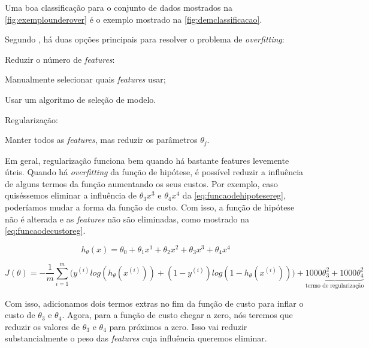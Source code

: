 Uma boa classificação para o conjunto de dados mostrados na \autoref{fig:exemplounderover} é o exemplo mostrado na \autoref{fig:demclassificacao}.

Segundo \cite{machinelearningcoursera}, há duas opções principais para resolver o problema de \textit{overfitting}:

\begin{alineas}
	\item Reduzir o número de \textit{features}:
		\begin{alineas}
			\item Manualmente selecionar quais \textit{features} usar;
			\item Usar um algoritmo de seleção de modelo.
		\end{alineas}
	\item Regularização:
		\begin{alineas}
			\item Manter todos as \textit{features}, mas reduzir os parâmetros $\theta_j$.
		\end{alineas}
\end{alineas}

Em geral, regularização funciona bem quando há bastante features levemente úteis. Quando há \textit{overfitting} da função de hipótese, é possível reduzir a influência de alguns termos da função aumentando os seus custos. Por exemplo, caso quiséssemos eliminar a influência de $\theta_3x^3$ e $\theta_4x^4$ da \autoref{eq:funcaodehipotesereg}, poderíamos mudar a forma da função de custo. Com isso, a função de hipótese não é alterada e as \textit{features} não são eliminadas, como mostrado na \autoref{eq:funcaodecustoreg}.

\begin{equation} \label{eq:funcaodehipotesereg}
h_{\theta}(x) = \theta_0 + \theta_1 x^1 + \theta_2 x^2 + \theta_3 x^3 + \theta_4 x^4
\end{equation}

\begin{equation} \label{eq:funcaodecustoreg}
J(\theta) = - \frac{1}{m}\sum\limits_{i=1}^{m}\Big( y^{(i)}log(h_{\theta}(x^{(i)})) + (1-y^{(i)})log(1 - h_{\theta}(x^{(i)})) \Big)
+ \underbrace{1000 \theta_3^2 + 1000 \theta_4^2}_\text{termo de regularização}
\end{equation}

Com isso, adicionamos dois termos extras no fim da função de custo para inflar o custo de $\theta_3$ e $\theta_4$. Agora, para a função de custo chegar a zero, nós teremos que reduzir os valores de $\theta_3$ e $\theta_4$ para próximos a zero. Isso vai reduzir substancialmente o peso das \textit{features} cuja influência queremos eliminar.


